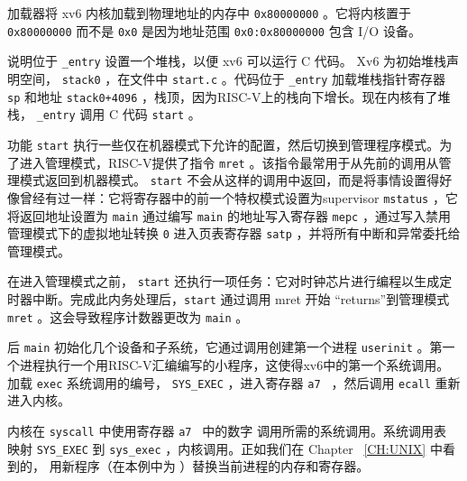 加载器将 xv6 内核加载到物理地址的内存中
    \texttt{0x80000000}    。它将内核置于
    \texttt{0x80000000}    而不是
    \texttt{0x0}   是因为地址范围
    \texttt{0x0:0x80000000}    包含 I/O 设备。  

说明位于
    \lstinline{_entry}    设置一个堆栈，以便 xv6 可以运行 C 代码。 Xv6 为初始堆栈声明空间，
    \lstinline{stack0}   ，在文件中
    \lstinline{start.c}   
        。代码位于
    \lstinline{_entry}   加载堆栈指针寄存器
    \texttt{sp}    和地址
    \lstinline{stack0+4096}    ，栈顶，因为RISC-V上的栈向下增长。现在内核有了堆栈，
    \lstinline{_entry}    调用 C 代码
    \lstinline{start}   
        。  

功能
    \lstinline{start}    执行一些仅在机器模式下允许的配置，然后切换到管理程序模式。为了进入管理模式，RISC-V提供了指令
    \lstinline{mret}    。该指令最常用于从先前的调用从管理模式返回到机器模式。
    \lstinline{start}    不会从这样的调用中返回，而是将事情设置得好像曾经有过一样：它将寄存器中的前一个特权模式设置为supervisor
    \lstinline{mstatus}    ，它将返回地址设置为
    \lstinline{main}    通过编写
    \lstinline{main}    的地址写入寄存器
    \lstinline{mepc}    ，通过写入禁用管理模式下的虚拟地址转换
    \lstinline{0}    进入页表寄存器
    \lstinline{satp}    ，并将所有中断和异常委托给管理模式。  

在进入管理模式之前，
    \lstinline{start}    还执行一项任务：它对时钟芯片进行编程以生成定时器中断。完成此内务处理后，\lstinline{start} 通过调用 mret 开始 “returns”到管理模式
    \lstinline{mret}    。这会导致程序计数器更改为
    \lstinline{main}   
        。  

后
    \lstinline{main}   
        初始化几个设备和子系统，它通过调用创建第一个进程
    \lstinline{userinit}   
        。第一个进程执行一个用RISC-V汇编编写的小程序，这使得xv6中的第一个系统调用。
        加载    \lstinline{exec}    系统调用的编号，   \lstinline{SYS_EXEC}   
       ，进入寄存器 {    \tt    a7   } ，然后调用   \lstinline{ecall}   重新进入内核。  

内核在   \lstinline{syscall}   中使用寄存器 {    \tt    a7   } 中的数字
        调用所需的系统调用。系统调用表      映射
    \lstinline{SYS_EXEC}    到    \lstinline{sys_exec}    ，内核调用。正如我们在 Chapter~    \ref{CH:UNIX}    中看到的，        用新程序（在本例中为        ）替换当前进程的内存和寄存器。  

